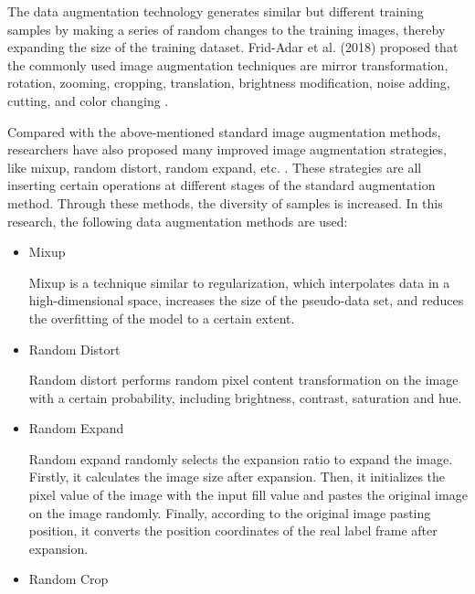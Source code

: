 \documentclass[sensors,article,submit,moreauthors,pdftex]{Definitions/mdpi}
\begin{document}
\begin{paracol}{2}
\begin{itemize}
The data augmentation technology generates similar but different training samples by making a series of random changes to the training images, thereby expanding the size of the training dataset. Frid-Adar et al. (2018) proposed that the commonly used image augmentation techniques are mirror transformation, rotation, zooming, cropping, translation, brightness modification, noise adding, cutting, and color changing \cite{frid2018gan}.

Compared with the above-mentioned standard image augmentation methods, researchers have also proposed many improved image augmentation strategies, like mixup, random distort, random expand, etc. \cite{cubuk2018autoaugment, devries2017improved}. These strategies are all inserting certain operations at different stages of the standard augmentation method. Through these methods, the diversity of samples is increased. In this research, the following data augmentation methods are used:

\begin{itemize}
\item{Mixup}

Mixup is a technique similar to regularization, which interpolates data in a high-dimensional space, increases the size of the pseudo-data set, and reduces the overfitting of the model to a certain extent. 
\end{itemize}


\begin{itemize}
\item{Random Distort}

Random distort performs random pixel content transformation on the image with a certain probability, including brightness, contrast, saturation and hue.

\end{itemize}

\begin{itemize}
\item{Random Expand}

Random expand randomly selects the expansion ratio to expand the image. Firstly, it calculates the image size after expansion. Then, it initializes the pixel value of the image with the input fill value and pastes the original image on the image randomly. Finally, according to the original image pasting position, it converts the position coordinates of the real label frame after expansion.

\end{itemize}


\begin{itemize}
\item{Random Crop}


\end{itemize}
\end{itemize}
\end{paracol}
\end{document}
